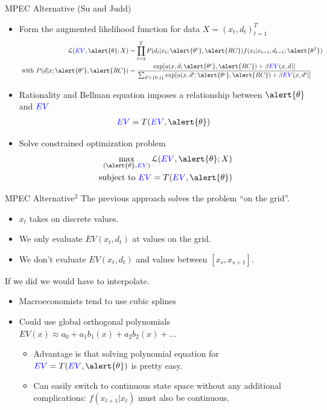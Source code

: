 \documentclass[aspectratio=169,11pt]{beamer}
\begin{document}
\begin{frame}{MPEC Alternative (Su and Judd)}
\begin{itemize}
\item Form the augmented likelihood function for data $X = (x_t, d_t)_{t=1}^T$
\begin{align*}
\mathcal{L}(\textcolor{blue}{EV}, \alert{\theta}; X) &= \prod_{t=2}^T P(d_t | x_t; \alert{\theta^c}, \alert{RC}) f(x_t | x_{t-1}, d_{t-1};\alert{\theta^f})\\
\mbox{ with }  P(d | x; \alert{\theta^c}, \alert{RC}) &= \frac{\exp[u(x,d;\alert{\theta^c},\alert{RC}) + \beta \textcolor{blue}{EV}(x,d)]}
{\sum_{d' \in \{0,1\}} \exp[u(x,d';\alert{\theta^c},\alert{RC}) + \beta \textcolor{blue}{EV}(x,d')]}\\
\end{align*}
\item Rationality and Bellman equation imposes a relationship between $\alert{\theta}$ and $\textcolor{blue}{EV}$
\begin{align*}
\textcolor{blue}{EV} = T(\textcolor{blue}{EV},\alert{\theta})
\end{align*}
\item Solve constrained optimization problem
\begin{align*}
\max_{(\alert{\theta},\textcolor{blue}{EV})} \mathcal{L}(\textcolor{blue}{EV}, \alert{\theta}; X)\\
\mbox{ subject to }  \textcolor{blue}{EV} = T(\textcolor{blue}{EV},\alert{\theta})
\end{align*}
\end{itemize}
\end{frame}


\begin{frame}{MPEC Alternative$^2$}
The previous approach solves the problem ``on the grid''.
\begin{itemize}
\item $x_t$ takes on discrete values.
\item We only evaluate $EV(x_t,d_t)$ at values on the grid.
\item We don't evaluate $EV(x_t,d_t)$ and values between $[x_s,x_{s+1}]$.
\end{itemize}
If we did we would have to \alert{interpolate}.
\begin{itemize}
\item Macroeconomists tend to use \alert{cubic splines}
\item Could use global orthogonal polynomials $EV(x) \approx a_0 + a_1 b_1(x)+ a_2 b_2(x) + \ldots$
\begin{itemize}
\item Advantage is that solving polynomial equation for $\textcolor{blue}{EV} = T(\textcolor{blue}{EV},\alert{\theta})$ is pretty easy.
\item Can easily switch to continuous state space without any additional complications:  $f(x_{t+1} | x_{t})$ must also be continuous.
\end{itemize}
\end{itemize}
\end{frame}
\end{document}
